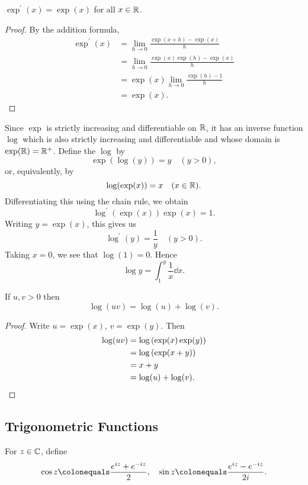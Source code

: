 \begin{lemma}
$\exp^\prime(x)=\exp(x)$ for all $x\in\mathbb R$.
\end{lemma}

\begin{proof}
By the addition formula,
\begin{align*}
\exp^\prime(x)
&=\lim_{h\to0}\frac{\exp(x+h)-\exp(x)}{h}\\
&=\lim_{h\to0}\frac{\exp(x)\exp(h)-\exp(x)}{h}\\
&=\exp(x)\lim_{h\to0}\frac{\exp(h)-1}{h}\\
&=\exp(x).
\end{align*}
\end{proof}

Since $\exp$ is strictly increasing and differentiable on $\mathbb R$, it has an inverse function $\log$ which is also strictly increasing and differentiable and whose domain is $\exp(\mathbb R)=\mathbb R^+$. 
Define the  $\log$ by 
\[\exp(\log(y))=y\quad(y>0),\]
or, equivalently, by 
\[\log(\exp(x))=x\quad(x\in\mathbb R).\]
Differentiating this using the chain rule, we obtain
\[\log^\prime(\exp(x))\exp(x)=1.\]
Writing $y=\exp(x)$, this gives us
\[\log^\prime(y)=\frac{1}{y}\quad(y>0).\]
Taking $x=0$, we see that $\log(1)=0$. Hence
\[\log y=\int_{1}^{y}\frac{1}{x}\dd{x}.\]

\begin{lemma}
If $u,v>0$ then
\begin{equation}
\log(uv)=\log(u)+\log(v).
\end{equation}
\end{lemma}

\begin{proof}
Write $u=\exp(x)$, $v=\exp(y)$. Then
\begin{align*}
\log(uv)
&=\log\left(\exp(x)\exp(y)\right)\\
&=\log\left(\exp(x+y)\right)\\
&=x+y\\
&=\log(u)+\log(v).
\end{align*}
\end{proof}


\pagebreak

\subsection{Trigonometric Functions}
\begin{definition}
For $z\in\mathbb C$, define
\begin{equation}\label{eqn:trigonometric-functions}
\cos z\colonequals\frac{e^{iz}+e^{-iz}}{2},\quad
\sin z\colonequals\frac{e^{iz}-e^{-iz}}{2i}.
\end{equation}
\end{definition}

